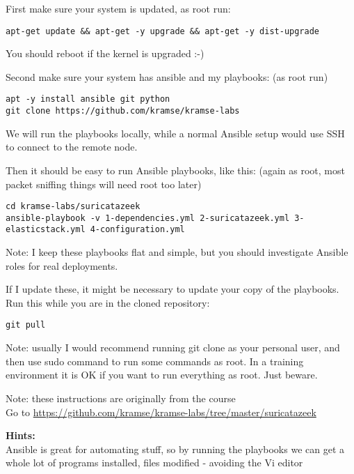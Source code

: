 \documentclass[a4paper,11pt,notitlepage]{report}
\begin{document}
First make sure your system is updated, as root run:

\begin{verbatim}
apt-get update && apt-get -y upgrade && apt-get -y dist-upgrade
\end{verbatim}

You should reboot if the kernel is upgraded :-)

Second make sure your system has ansible and my playbooks: (as root run)
\begin{verbatim}
apt -y install ansible git python
git clone https://github.com/kramse/kramse-labs
\end{verbatim}

We will run the playbooks locally, while a normal Ansible setup would use SSH to connect to the remote node.

Then it should be easy to run Ansible playbooks, like this: (again as root, most packet sniffing things will need root too later)

\begin{verbatim}
cd kramse-labs/suricatazeek
ansible-playbook -v 1-dependencies.yml 2-suricatazeek.yml 3-elasticstack.yml 4-configuration.yml
\end{verbatim}

Note: I keep these playbooks flat and simple, but you should investigate Ansible roles for real deployments.

If I update these, it might be necessary to update your copy of the playbooks. Run this while you are in the cloned repository:

\begin{verbatim}
git pull
\end{verbatim}

Note: usually I would recommend running git clone as your personal user, and then use sudo command to run some commands as root. In a training environment it is OK if you want to run everything as root. Just beware.

Note: these instructions are originally from the course\\
Go to \url{https://github.com/kramse/kramse-labs/tree/master/suricatazeek}

{\bf Hints:}\\
Ansible is great for automating stuff, so by running the playbooks we can get a whole lot of programs installed, files modified - avoiding the Vi editor \smiley
\end{document}
